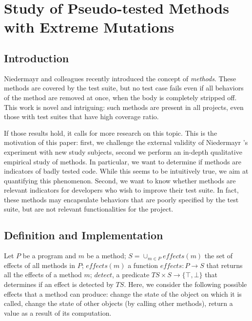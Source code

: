 \section{Study of Pseudo-tested Methods with Extreme Mutations}
\label{sec:transversal-contributions:descartes}


\subsection{Introduction}
\label{subsec:transversal-contributions:descartes:introduction}

Niedermayr and colleagues \cite{niedermayr_will_2016} recently introduced the concept of \emph{\pseudotested{} methods}. 
These methods are covered by the test suite, but no test case fails even if all behaviors of the method are removed at once, \ie when the body is completely stripped off.
This work is novel and intriguing:
such \pseudotested{} methods are present in all projects, even those with test suites that have high coverage ratio.

If those results hold, it calls for more research on this topic.
This is the motivation of this paper: 
first, we challenge the external validity of Niedermayr \etal's experiment with new study subjects, 
second we perform an in-depth qualitative empirical study of \pseudotested{} methods. 
In particular, we want to determine if \pseudotested{} methods are indicators of badly tested code. 
While this seems to be intuitively true, we aim at quantifying this phenomenon.
Second, we want to know whether \pseudotested{} methods are relevant indicators for developers who wish to improve their test suite. 
In fact, these methods may encapsulate behaviors that are poorly specified by the test suite, but are not relevant functionalities for the project.

\subsection{Definition and Implementation}
\label{subsec:transversal-contributions:descartes:definitions}

Let $P$ be a program and $m$ be a method; $S=\cup_{m \in P}{\mathit{effects}(m)}$ the set of effects of all methods in $P$; 
$\mathit{effects}(m)$ a function $\mathit{effects}:P \rightarrow S$ that returns all the effects of a method $m$; $detect$, a predicate $TS \times S \rightarrow \{\top, \bot\}$ that determines if an effect is detected by $TS$.
Here, we consider the following possible effects that a method can produce: 
change the state of the object on which it is called, change the state of other objects (by calling other methods), return a value as a result of its computation.


